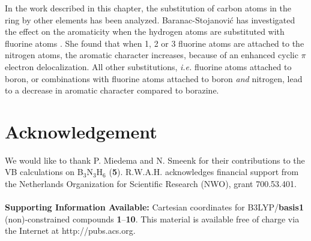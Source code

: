 In the work described in this chapter, the substitution of carbon atoms in the ring by other elements has been analyzed. Baranac-Stojanovi\'c has investigated the effect on the aromaticity when the hydrogen atoms are substituted with fluorine atoms \cite{ac09}. She found that when 1, 2 or 3 fluorine atoms are attached to the nitrogen atoms, the aromatic character increases, because of an enhanced cyclic $\pi$ electron delocalization. All other substitutions, \textit{i.e.} fluorine atoms attached to boron, or combinations with fluorine atoms attached to boron \textit{and} nitrogen, lead to a decrease in aromatic character compared to borazine.

\section*{Acknowledgement}

We would like to thank P. Miedema and N. Smeenk for their contributions to the VB calculations on B$_3$N$_3$H$_6$ (\textbf{5}).
R.W.A.H. acknowledges financial support from the Netherlands Organization for Scientific Research (NWO), grant 700.53.401.
\\
\\
\noindent \textbf{Supporting Information Available:} Cartesian coordinates for B3LYP/\textbf{basis1} (non)-constrained
compounds \textbf{1}--\textbf{10}. This material is available free of charge via the Internet at
http://pubs.acs.org.



